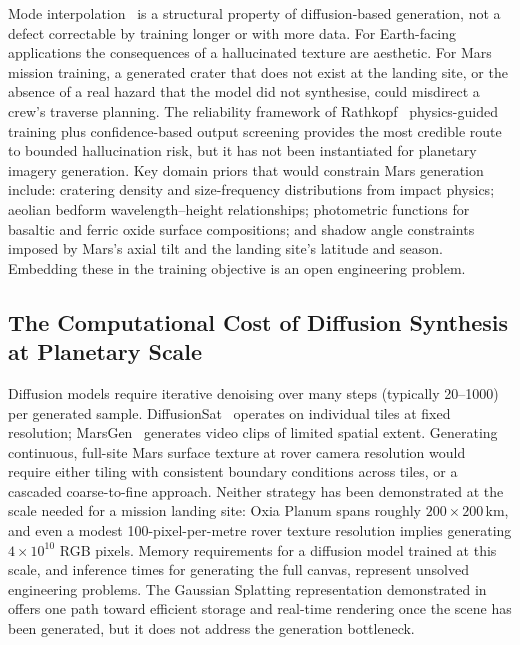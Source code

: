 \documentclass[10pt,journal]{IEEEtran}
\begin{document}
Mode interpolation~\cite{aithal2024hallucination} is a structural property of
diffusion-based generation, not a defect correctable by training longer or with
more data. For Earth-facing applications the consequences of a hallucinated
texture are aesthetic. For Mars mission training, a generated crater that does
not exist at the landing site, or the absence of a real hazard that the model
did not synthesise, could misdirect a crew's traverse planning. The reliability
framework of Rathkopf~\cite{rathkopf2025reliability} physics-guided training
plus confidence-based output screening provides the most credible route to
bounded hallucination risk, but it has not been instantiated for planetary
imagery generation. Key domain priors that would constrain Mars generation
include: cratering density and size-frequency distributions from impact physics;
aeolian bedform wavelength--height relationships; photometric functions for basaltic
and ferric oxide surface compositions; and shadow angle constraints imposed by
Mars's axial tilt and the landing site's latitude and season. Embedding these in
the training objective is an open engineering problem.

\subsection{The Computational Cost of Diffusion Synthesis at Planetary Scale}
\label{subsec:compute}

Diffusion models require iterative denoising over many steps (typically 20--1000)
per generated sample. DiffusionSat~\cite{khanna2024diffusionsat} operates on
individual tiles at fixed resolution; MarsGen~\cite{li2025martian} generates
video clips of limited spatial extent. Generating continuous,
full-site Mars surface texture at rover camera resolution would require either
tiling with consistent boundary conditions across tiles, or a cascaded coarse-to-fine
approach. Neither strategy has been demonstrated at the scale needed for a
mission landing site: Oxia Planum spans roughly $200 \times 200$\,km, and even
a modest 100-pixel-per-metre rover texture resolution implies generating $4 \times
10^{10}$ RGB pixels. Memory requirements for a diffusion model trained at this
scale, and inference times for generating the full canvas, represent unsolved
engineering problems. The Gaussian Splatting representation demonstrated
in~\cite{martinezpetersen2025hifi} offers one path toward efficient storage and
real-time rendering once the scene has been generated, but it does not address
the generation bottleneck.
\end{document}
